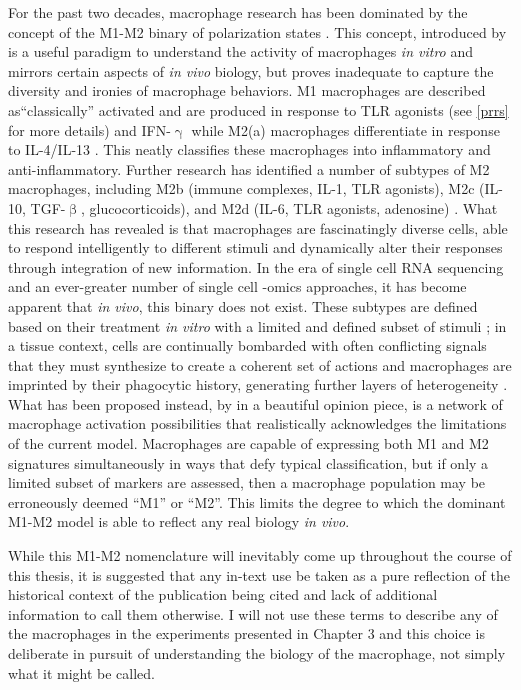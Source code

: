 For the past two decades, macrophage research has been dominated by the concept of the M1\hyp{}M2 binary of polarization states \citep{Italiani2014, Mills2015}. This concept, introduced by \citet{Mills2000} is a useful paradigm to understand the activity of macrophages \textit{in vitro} and mirrors certain aspects of \textit{in vivo} biology, but proves inadequate to capture the diversity and ironies of macrophage behaviors. M1 macrophages are described as``classically'' activated and are produced in response to TLR agonists (see \autoref{prrs} for more details) and IFN\hyp{}$\upgamma$  while M2(a) macrophages differentiate in response to IL\hyp{}4/IL\hyp{}13 \citep{Mills2014, Wynn2013}. This neatly classifies these macrophages into inflammatory and anti\hyp{}inflammatory. Further research has identified a number of subtypes of M2 macrophages, including M2b (immune complexes, IL\hyp{}1, TLR agonists), M2c (IL\hyp{}10, TGF\hyp{}$\upbeta$, glucocorticoids), and M2d (IL\hyp{}6, TLR agonists, adenosine) \citep{Huang2018, Viola2019}. What this research has revealed is that macrophages are fascinatingly diverse cells, able to respond intelligently to different stimuli and dynamically alter their responses through integration of new information. In the era of single cell RNA sequencing and an ever\hyp{}greater number of single cell \hyp{}omics approaches, it has become apparent that \textit{in vivo}, this binary does not exist. These subtypes are defined based on their treatment \textit{in vitro} with a limited and defined subset of stimuli \citep{Gosselin2014, Wynn2013}; in a tissue context, cells are continually bombarded with often conflicting signals that they must synthesize to create a coherent set of actions \citep{Murray2014} and macrophages are imprinted by their phagocytic history, generating further layers of heterogeneity \citep{Gonzalez2017}. What has been proposed instead, by \citet{Nahrendorf2016} in a beautiful opinion piece, is a network of macrophage activation possibilities that realistically acknowledges the limitations of the current model. Macrophages are capable of expressing both M1 and M2 signatures simultaneously in ways that defy typical classification, but if only a limited subset of markers are assessed, then a macrophage population may be erroneously deemed ``M1'' or ``M2''. This limits the degree to which the dominant M1\hyp{}M2 model is able to reflect any real biology \textit{in vivo}. 

While this M1\hyp{}M2 nomenclature will inevitably come up throughout the course of this thesis, it is suggested that any in\hyp{}text use be taken as a pure reflection of the historical context of the publication being cited and lack of additional information to call them otherwise. I will not use these terms to describe any of the macrophages in the experiments presented in Chapter 3 and this choice is deliberate in pursuit of understanding the biology of the macrophage, not simply what it might be called.

